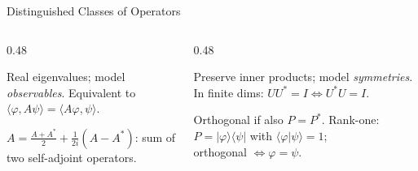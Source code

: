\documentclass{beamer}
\newcommand{\ket}[1]{|#1\rangle}
\newcommand{\bra}[1]{\langle#1|}
\newcommand{\braket}[2]{\langle#1|#2\rangle}
\newcommand{\ip}[2]{\langle #1, #2 \rangle}
\begin{document}
\begin{frame}[shrink=10]{Distinguished Classes of Operators}
  \begin{columns}[T]
    \begin{column}{0.48\textwidth}
      \begin{tcolorbox}[thmbox={Self-adjoint (A = A*)}]
        Real eigenvalues; model \emph{observables}. Equivalent to\\
        $\ip{\varphi}{A\psi}=\ip{A\varphi}{\psi}$.
      \end{tcolorbox}
      \vspace{0.3em}
      \begin{tcolorbox}[thmbox={Normal (AA* = A*A)}]
        $A = \frac{A+A^*}{2} + \frac{1}{2i}(A-A^*)$: sum of two
        self-adjoint operators.
      \end{tcolorbox}
    \end{column}
    \begin{column}{0.48\textwidth}
      \begin{tcolorbox}[thmbox={Unitary (UU* = I)}]
        Preserve inner products; model \emph{symmetries}. In finite dims:
        $UU^*=I \Leftrightarrow U^*U=I$.
      \end{tcolorbox}
      \vspace{0.3em}
      \begin{tcolorbox}[thmbox={Projection (P squared = P)}]
        Orthogonal if also $P=P^*$. Rank-one: $P=\ket\varphi\bra\psi$ with
        $\braket\varphi\psi=1$;\\
        orthogonal $\Leftrightarrow \varphi=\psi$.
      \end{tcolorbox}
    \end{column}
  \end{columns}
\end{frame}
\end{document}
